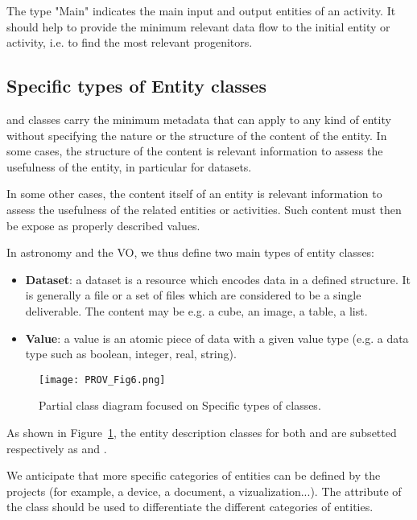 The type "Main" indicates the main input and output entities of an activity. It should help to provide the minimum relevant data flow to the initial entity or activity, i.e. to find the most relevant progenitors.


\subsection{Specific types of Entity classes}
\label{sec:spec_entities}

 and  classes carry the minimum metadata that can apply to any kind of entity without specifying the nature or the structure of the content of the entity. 
In some cases, the structure of the content is relevant information to assess the usefulness of the entity, in particular for datasets.

In some other cases, the content itself of an entity is relevant information to assess the usefulness of the related entities or activities. Such content must then be expose as properly described values.

In astronomy and the VO, we thus define two main types of entity classes:

\begin{itemize}
    \item \textbf{Dataset}: a dataset is a resource which encodes data in a defined structure. It is generally a file or a set of files which are considered to be a single deliverable. The content may be e.g. a cube, an image, a table, a list.
    \item \textbf{Value}: a value is an atomic piece of data with a given value type (e.g. a data type such as boolean, integer, real, string).
\end{itemize}

\begin{figure}[ht]
\centering
\texttt{[image: PROV\_Fig6.png]}
\caption[Partial class diagram focused on specific types of  classes.]{Partial class diagram focused on Specific types of  classes.}
\label{fig:classdiagram_entityclasses}
\end{figure}

As shown in Figure~\ref{fig:classdiagram_entityclasses}, the entity description classes for both  and  are subsetted respectively as  and .

We anticipate that more specific categories of entities can be defined by the projects (for example, a device, a document, a vizualization...). The  attribute of the  class should be used to differentiate the different categories of entities.


